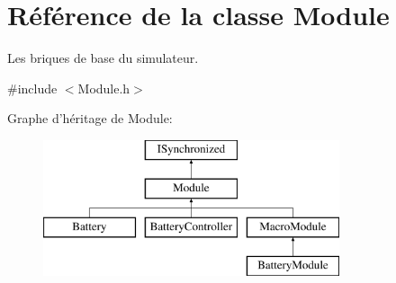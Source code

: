 \hypertarget{classModule}{\section{Référence de la classe Module}
\label{classModule}
}


Les briques de base du simulateur.  




{\ttfamily \#include $<$Module.\-h$>$}

Graphe d'héritage de Module\-:\begin{figure}[H]
\begin{center}
\leavevmode
\includegraphics[height=4.000000cm]{classModule}
\end{center}
\end{figure}
